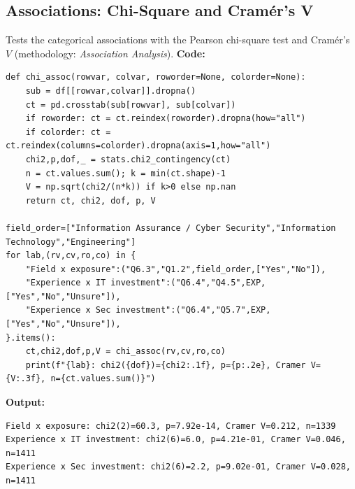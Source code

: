 \subsection{Associations: Chi-Square and Cram\'er's V}
Tests the categorical associations with the Pearson chi-square test and Cram\'er's $V$ (methodology: \emph{Association Analysis}).
\noindent\textbf{Code:}\nopagebreak
{\scriptsize\begin{verbatim}
def chi_assoc(rowvar, colvar, roworder=None, colorder=None):
    sub = df[[rowvar,colvar]].dropna()
    ct = pd.crosstab(sub[rowvar], sub[colvar])
    if roworder: ct = ct.reindex(roworder).dropna(how="all")
    if colorder: ct = ct.reindex(columns=colorder).dropna(axis=1,how="all")
    chi2,p,dof,_ = stats.chi2_contingency(ct)
    n = ct.values.sum(); k = min(ct.shape)-1
    V = np.sqrt(chi2/(n*k)) if k>0 else np.nan
    return ct, chi2, dof, p, V

field_order=["Information Assurance / Cyber Security","Information Technology","Engineering"]
for lab,(rv,cv,ro,co) in {
    "Field x exposure":("Q6.3","Q1.2",field_order,["Yes","No"]),
    "Experience x IT investment":("Q6.4","Q4.5",EXP,["Yes","No","Unsure"]),
    "Experience x Sec investment":("Q6.4","Q5.7",EXP,["Yes","No","Unsure"]),
}.items():
    ct,chi2,dof,p,V = chi_assoc(rv,cv,ro,co)
    print(f"{lab}: chi2({dof})={chi2:.1f}, p={p:.2e}, Cramer V={V:.3f}, n={ct.values.sum()}")
\end{verbatim}}
\noindent\textbf{Output:}\nopagebreak
{\scriptsize\begin{verbatim}
Field x exposure: chi2(2)=60.3, p=7.92e-14, Cramer V=0.212, n=1339
Experience x IT investment: chi2(6)=6.0, p=4.21e-01, Cramer V=0.046, n=1411
Experience x Sec investment: chi2(6)=2.2, p=9.02e-01, Cramer V=0.028, n=1411
\end{verbatim}}

